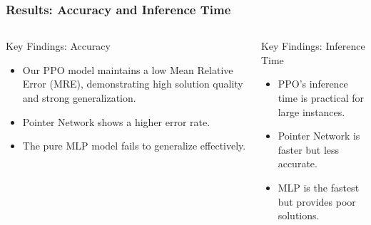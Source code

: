 \begin{frame}
    \frametitle{Results: Accuracy and Inference Time}

    \begin{figure}
        \centering
        \hfill %
    \end{figure}
    
    \vspace{-0.6em} %

    \begin{columns}[T]
        \begin{column}{0.5\textwidth}
            \begin{block}{Key Findings: Accuracy}
                \begin{itemize}
                    \item Our PPO model maintains a low Mean Relative Error (MRE), demonstrating high solution quality and strong generalization.
                    \item Pointer Network shows a higher error rate.
                    \item The pure MLP model fails to generalize effectively.
                \end{itemize}
            \end{block}
        \end{column}

        \begin{column}{0.5\textwidth}
            \begin{block}{Key Findings: Inference Time}
                \begin{itemize}
                    \item PPO's inference time is practical for large instances.
                    \item Pointer Network is faster but less accurate.
                    \item MLP is the fastest but provides poor solutions.
                \end{itemize}
            \end{block}
        \end{column}
    \end{columns}
\end{frame}